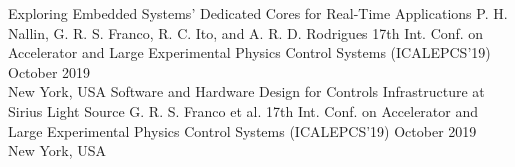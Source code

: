 \documentclass[
	a4paper,
]{fortysecondscv}
\begin{document}
\begin{cvtable}
	\cvpubitem
        {
            Exploring Embedded Systems' Dedicated Cores for Real-Time Applications}
        {P. H. Nallin, G. R. S. Franco, R. C. Ito, and A. R. D. Rodrigues}
		{17th Int. Conf. on Accelerator and Large Experimental Physics Control Systems (ICALEPCS'19)}
        {October 2019 \\ New York, USA}
	\cvpubitem
        {
            Software and Hardware Design for Controls Infrastructure at Sirius Light Source}
        {G. R. S. Franco et al.}
        {17th Int. Conf. on Accelerator and Large Experimental Physics Control Systems (ICALEPCS'19)}
        {October 2019 \\ New York, USA}
\end{cvtable}
\end{document}
